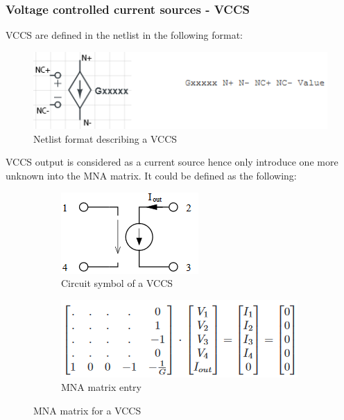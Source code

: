 \documentclass[12pt,a4paper]{article}
\begin{document}
\subsubsection{Voltage controlled current sources - VCCS}
VCCS are defined in the netlist in the following format: \par 
\begin{figure} [h!]
	\centering
	\includegraphics[]{G.png}
	\caption{Netlist format describing a VCCS \cite{MNA}}
\end{figure}
VCCS output is considered as a current source hence only introduce one more unknown into the MNA matrix. 
It could be defined as the following:
\begin{figure} [h!]
	\centering
	\begin{subfigure}{.5\textwidth}
	  \centering
	  \includegraphics[scale=0.8]{G_diagram.PNG}
	  \caption{Circuit symbol of a VCCS}
	  \label{fig:sub1}
	\end{subfigure}%
	\begin{subfigure}{.5\textwidth}
	  \centering
	  \includegraphics[width= \textwidth]{G_matrices.PNG}
	  \caption{MNA matrix entry}
	  \label{fig:sub2}
	\end{subfigure}
	\caption{MNA matrix for a VCCS \cite{jahn_margraf_habchi_jacob_2003}}
	\label{fig:test}
\end{figure} \pagebreak
\end{document}
